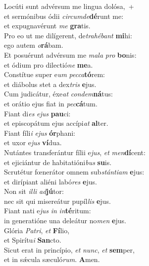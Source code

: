 \evenverse Locúti sunt advérsum me lingua dolósa,~+\\\evenverse  et sermónibus ódii \textit{cir}\textit{cum}\textit{de}\textbf{dé}runt me:~\*\\
\evenverse et expugnavérunt \textit{me} \textbf{gra}tis.\\
\oddverse Pro eo ut me dilígerent, de\textit{tra}\textit{hé}\textit{bant} \textbf{mi}hi:~\*\\
\oddverse ego autem \textit{o}\textbf{rá}bam.\\
\evenverse Et posuérunt advérsum me \textit{ma}\textit{la} \textit{pro} \textbf{bo}nis:~\*\\
\evenverse et ódium pro dilectió\textit{ne} \textbf{me}a.\\
\oddverse Constítue super e\textit{um} \textit{pec}\textit{ca}\textbf{tó}rem:~\*\\
\oddverse et diábolus stet a dex\textit{tris} \textbf{e}jus.\\
\evenverse Cum judicátur, éxe\textit{at} \textit{con}\textit{dem}\textbf{ná}tus:~\*\\
\evenverse et orátio ejus fiat in \textit{pec}\textbf{cá}tum.\\
\oddverse Fiant di\textit{es} \textit{e}\textit{jus} \textbf{pau}ci:~\*\\
\oddverse et episcopátum ejus accípi\textit{at} \textbf{al}ter.\\
\evenverse Fiant fíli\textit{i} \textit{e}\textit{jus} \textbf{ór}phani:~\*\\
\evenverse et uxor e\textit{jus} \textbf{ví}dua.\\
\oddverse Nutántes transferántur fílii e\textit{jus}, \textit{et} \textit{men}\textbf{dí}cent:~\*\\
\oddverse et ejiciántur de habitatióni\textit{bus} \textbf{su}is.\\
\evenverse Scrutétur fœnerátor omnem sub\textit{stán}\textit{ti}\textit{am} \textbf{e}jus:~\*\\
\evenverse et dirípiant aliéni labó\textit{res} \textbf{e}jus.\\
\oddverse Non sit \textit{il}\textit{li} \textit{ad}\textbf{jú}tor:~\*\\
\oddverse nec sit qui misereátur pupíl\textit{lis} \textbf{e}jus.\\
\evenverse Fiant nati e\textit{jus} \textit{in} \textit{in}\textbf{té}ritum:~\*\\
\evenverse in generatióne una deleátur no\textit{men} \textbf{e}jus.\\
\oddverse Glória \textit{Pa}\textit{tri}, \textit{et} \textbf{Fí}lio,~\*\\
\oddverse et Spirítu\textit{i} \textbf{San}cto.\\
\evenverse Sicut erat in princípio, \textit{et} \textit{nunc}, \textit{et} \textbf{sem}per,~\*\\
\evenverse et in sǽcula sæculó\textit{rum}. \textbf{A}men.\\
